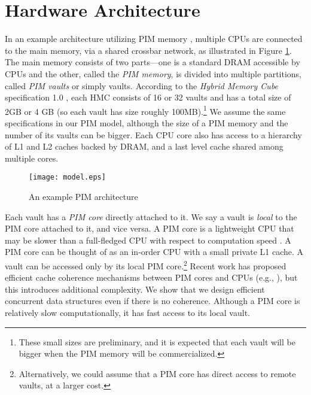 \section{Hardware Architecture}


\label{section:hardware_model}

In an example architecture utilizing PIM memory \cite{Ahn2015:2, Zhang2014:TTP}, 
multiple CPUs are connected to the main
memory, via a shared crossbar network, as illustrated in Figure \ref{figure:model}.
The main memory consists of two parts---one is a standard DRAM accessible by CPUs 
and the other, called the \textit{PIM memory}, is divided into multiple partitions, 
called \textit{PIM vaults} or simply vaults.  
According to the \textit{Hybrid Memory Cube} specification 1.0 \cite{website:HMC}, 
each HMC consists of 16 or 
32 vaults and has a total size of 2GB or 4 GB (so each vault has size roughly 100MB).\footnote{
These small sizes are preliminary, and it is expected that each vault will be bigger when the 
PIM memory will be commercialized.} 
We assume the same specifications in our PIM model, although the size of a PIM memory and 
the number of its vaults can be bigger. 
Each CPU core also has access to a hierarchy of L1 and L2 caches backed by DRAM,
and a last level cache shared among multiple cores. 

\begin{figure}[ht!]
\centering
\texttt{[image: model.eps]}
\caption{An example PIM architecture}
\label{figure:model}
\end{figure}

Each vault has a \textit{PIM core} directly attached to it.
We say a vault is \textit{local} to the PIM core attached to it, and vice versa.
A PIM core is a lightweight CPU that may be slower than a full-fledged CPU
with respect to computation speed \cite{Ahn2015:2}. 
A PIM core can be thought of as an in-order CPU with a small private L1 cache.
A vault can be accessed only by its local PIM core.\footnote{
Alternatively, we could assume that a PIM core has direct access to remote vaults, at a larger cost. }
Recent work has proposed efficient cache coherence mechanisms between PIM cores and 
CPUs  
(e.g., \cite{boroumand2016, Ahn2015:1}), but this introduces additional complexity. 
We show that we design efficient concurrent data structures even if there is no coherence.
Although a PIM core is relatively slow computationally, it has fast access to its local vault.

